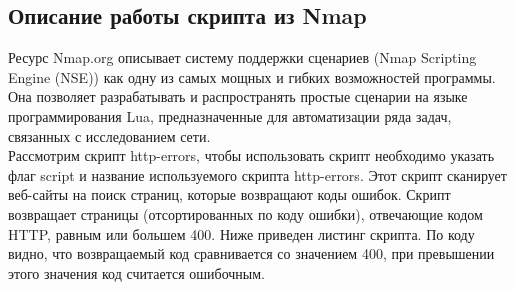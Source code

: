 \documentclass[10pt,a4paper]{report}
\begin{document}
\subsection{Описание работы скрипта из Nmap}
Ресурс Nmap.org описывает систему поддержки сценариев (Nmap Scripting Engine (NSE)) как одну из самых мощных и гибких возможностей программы. Она позволяет разрабатывать и распространять простые сценарии на языке программирования Lua, предназначенные для автоматизации ряда задач, связанных с исследованием сети. \\
Рассмотрим скрипт http-errors, чтобы использовать скрипт необходимо указать флаг script и название используемого скрипта http-errors. 
Этот скрипт сканирует веб-сайты на поиск страниц, которые возвращают коды ошибок.
Скрипт возвращает страницы (отсортированных по коду ошибки), отвечающие кодом HTTP, равным или большем 400.
Ниже приведен листинг скрипта. По коду видно, что возвращаемый  код сравнивается со значением 400, при превышении этого значения код считается ошибочным.
\end{document}
